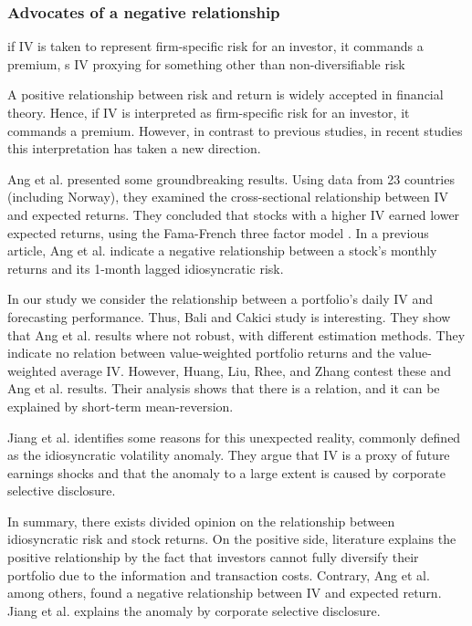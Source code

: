 \subsubsection{Advocates of a negative relationship}
if IV is taken to represent firm-specific risk for an investor, it commands a premium, s IV proxying for something other than non-diversifiable risk

A positive relationship between risk and return is widely accepted in financial theory. Hence, if IV is interpreted as firm-specific risk for an investor, it commands a premium. However, in contrast to previous studies, in recent studies this interpretation has taken a new direction.

Ang et al. \cite{angetal09} presented some groundbreaking results. Using data from 23 countries (including Norway), they examined the cross-sectional relationship between IV and expected returns. They concluded that stocks with a higher IV earned lower expected returns, using the Fama-French three factor model \cite{famafrench}. In a previous article, Ang et al. \cite{angetal06} indicate a negative relationship between a stock's monthly returns and its 1-month lagged idiosyncratic risk. 

In our study we consider the relationship between a portfolio's daily IV and forecasting performance. Thus, Bali and Cakici \cite{balicakici06} study is interesting. They show that Ang et al. \cite{angetal09} results where not robust, with different estimation methods. They indicate no relation between value-weighted portfolio returns and the value-weighted average IV. However, Huang, Liu, Rhee, and Zhang \cite{huang} contest these and Ang et al. \cite{angetal09} results. Their analysis shows that there is a relation, and it can be explained by short-term mean-reversion.

Jiang et al. \cite{jiangetal} identifies some reasons for this unexpected reality, commonly defined as the idiosyncratic volatility anomaly. They argue that IV is a proxy of future earnings shocks and that the anomaly to a large extent is caused by corporate selective disclosure. 

In summary, there exists divided opinion on the relationship between idiosyncratic risk and stock returns. On the positive side, literature explains the positive relationship by the fact that investors cannot fully diversify their portfolio due to the information and transaction costs. Contrary, Ang et al. \cite{angetal06} among others, found a negative relationship between IV and expected return. Jiang et al. \cite{jiangetal} explains the anomaly by corporate selective disclosure.

